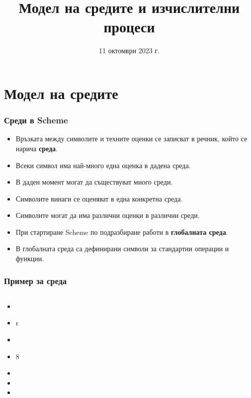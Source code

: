 \documentclass[alsotrans]{beamerswitch}
\title[Среди и процеси]{Модел на средите и изчислителни процеси}
\date{11 октомври 2023 г.}
\begin{document}
\begin{frame}
  \titlepage
\end{frame}

\section{Модел на средите}

\begin{frame}
  \frametitle{Среди в Scheme}

  \begin{itemize}[<+->]
  \item Връзката между символите и техните оценки се записват в речник, който се нарича \textbf{среда}.
  \item Всеки символ има най-много една оценка в дадена среда.
  \item В даден момент могат да съществуват много среди.
  \item Символите винаги се оценяват в една конкретна среда.
  \item \alert{Символите могат да има различни оценки в различни среди.}
  \item При стартиране Scheme по подразбиране работи в \textbf{глобалната среда}.
  \item В глобалната среда са дефинирани символи за стандартни операции и функции.
  \end{itemize}
\end{frame}

\begin{frame}
  \frametitle{Пример за среда}

  \begin{columns}[T,onlytextwidth]
    \begin{column}{.5\textwidth}
      \begin{itemize}[<+->]
      \item {}
      \item \evalstoerr r
      \item {}
      \item {}8
      \item {}
      \item {}
      \item {}
      \end{itemize}
    \end{column}

    \begin{column}{.5\textwidth}
    \end{column}
  \end{columns}
\end{frame}
\end{document}
